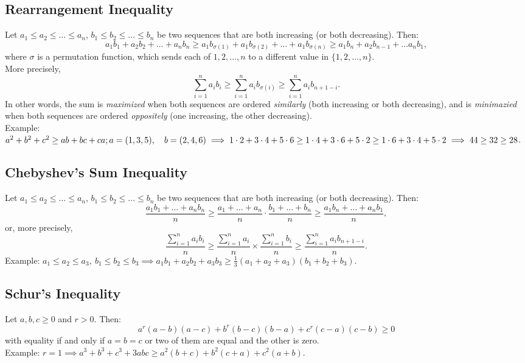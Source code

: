 \documentclass[a4paper,11pt]{article}
\begin{document}
\subsection{Rearrangement Inequality}
\begin{tcolorbox}[breakable]
    Let $a_1 \leq a_2 \leq \dots \leq a_n$, $b_1 \leq b_2 \leq \dots \leq b_n$ be two sequences that are both increasing (or both decreasing). Then:
    \[
    a_1b_1 + a_2b_2 + \dots + a_nb_n \geq a_1b_{\sigma(1)} + a_1b_{\sigma(2)} + \dots + a_1b_{\sigma(n)} \geq a_1b_{n} + a_2b_{n-1} + \dots a_nb_{1}, 
    \]
    where $\sigma$ is a permutation function, which sends each of $1,2, \dots, n$ to a different value in $\{1,2,\dots,n\}$. \\[6pt]
    More precisely,
    \[
    \sum_{i=1}^n a_ib_i \geq \sum_{i=1}^n a_ib_{\sigma(i)} \geq \sum_{i=1}^n a_ib_{n+1-i}.
    \]
    In other words, the sum is \emph{maximized} when both sequences are ordered \emph{similarly} (both increasing or both decreasing), and is \emph{minimazied} when both sequences are ordered \emph{oppositely} (one increasing, the other decreasing). \\[6pt]
    Example: $\textstyle a^2+b^2+c^2 \geq ab + bc + ca; \\[6pt] 
    a=(1,3,5), \quad b=(2,4,6)
    \implies 1\cdot2+3\cdot4+5\cdot6 \geq 1\cdot4+3\cdot6+5\cdot2 \geq 1\cdot6+3\cdot4+5\cdot2 \implies 44 \geq 32 \geq 28$.
\end{tcolorbox}


\subsection{Chebyshev's Sum Inequality}
\begin{tcolorbox}[breakable]
    Let $a_1 \leq a_2 \leq \dots \leq a_n$, $b_1 \leq b_2 \leq \dots \leq b_n$ be two sequences that are both increasing (or both decreasing). Then:
    \[
    \frac{a_1b_1 + \dots + a_nb_n}{n} \geq \frac{a_1 + \dots + a_n}{n} \cdot \frac{b_1 + \dots + b_n}{n} \geq \frac{a_1b_n + \dots + a_nb_1}{n},
    \]
    or, more precisely,
    \[
    \frac{\sum_{i=1}^n a_ib_i}{n} \geq \frac{\sum_{i=1}^n a_i}{n} \times \frac{\sum_{i=1}^n b_i}{n} \geq \frac{\sum_{i=1}^n a_ib_{n+1-i}}{n}.
    \]
    Example: $a_1 \leq a_2 \leq a_3,\ b_1 \leq b_2 \leq b_3 \implies \textstyle a_1b_1 + a_2b_2 + a_3b_3 \geq \frac{1}{3} (a_1+a_2+a_3)(b_1+b_2+b_3)$.
\end{tcolorbox}


\subsection{Schur's Inequality}
\begin{tcolorbox}[breakable]
    Let $a,b,c \geq 0$ and $r>0$. Then:
    \[
    a^r(a-b)(a-c) + b^r(b-c)(b-a) + c^r(c-a)(c-b) \geq 0
    \]
    with equality if and only if $a=b=c$ or two of them are equal and the other is zero. \\[6pt]
    Example: $\textstyle r=1 \implies a^3+b^3+c^3+3abc\geq a^2(b+c) + b^2(c+a) + c^2(a+b)$.
\end{tcolorbox}
\end{document}
